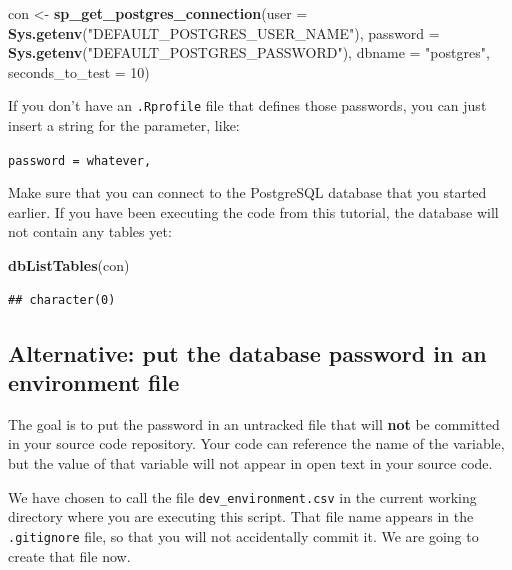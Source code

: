 \documentclass[]{book}
\newenvironment{Shaded}{\begin{snugshade}}{\end{snugshade}}
\newcommand{\DataTypeTok}[1]{\textcolor[rgb]{0.13,0.29,0.53}{#1}}
\newcommand{\DecValTok}[1]{\textcolor[rgb]{0.00,0.00,0.81}{#1}}
\newcommand{\KeywordTok}[1]{\textcolor[rgb]{0.13,0.29,0.53}{\textbf{#1}}}
\newcommand{\NormalTok}[1]{#1}
\newcommand{\StringTok}[1]{\textcolor[rgb]{0.31,0.60,0.02}{#1}}
\theoremstyle{definition}
\theoremstyle{definition}
\theoremstyle{definition}
\theoremstyle{remark}
\begin{document}
\begin{Shaded}
\begin{Highlighting}[]
\NormalTok{con <-}\StringTok{ }\KeywordTok{sp_get_postgres_connection}\NormalTok{(}\DataTypeTok{user =} \KeywordTok{Sys.getenv}\NormalTok{(}\StringTok{"DEFAULT_POSTGRES_USER_NAME"}\NormalTok{),}
                         \DataTypeTok{password =} \KeywordTok{Sys.getenv}\NormalTok{(}\StringTok{"DEFAULT_POSTGRES_PASSWORD"}\NormalTok{),}
                         \DataTypeTok{dbname =} \StringTok{"postgres"}\NormalTok{,}
                         \DataTypeTok{seconds_to_test =} \DecValTok{10}\NormalTok{)}
\end{Highlighting}
\end{Shaded}

If you don't have an \texttt{.Rprofile} file that defines those
passwords, you can just insert a string for the parameter, like:

\texttt{password\ =\ \textquotesingle{}whatever\textquotesingle{},}

Make sure that you can connect to the PostgreSQL database that you
started earlier. If you have been executing the code from this tutorial,
the database will not contain any tables yet:

\begin{Shaded}
\begin{Highlighting}[]
\KeywordTok{dbListTables}\NormalTok{(con)}
\end{Highlighting}
\end{Shaded}

\begin{verbatim}
## character(0)
\end{verbatim}

\hypertarget{alternative-put-the-database-password-in-an-environment-file}{%
\subsection{Alternative: put the database password in an environment
file}\label{alternative-put-the-database-password-in-an-environment-file}}

The goal is to put the password in an untracked file that will
\textbf{not} be committed in your source code repository. Your code can
reference the name of the variable, but the value of that variable will
not appear in open text in your source code.

We have chosen to call the file \texttt{dev\_environment.csv} in the
current working directory where you are executing this script. That file
name appears in the \texttt{.gitignore} file, so that you will not
accidentally commit it. We are going to create that file now.
\end{document}
